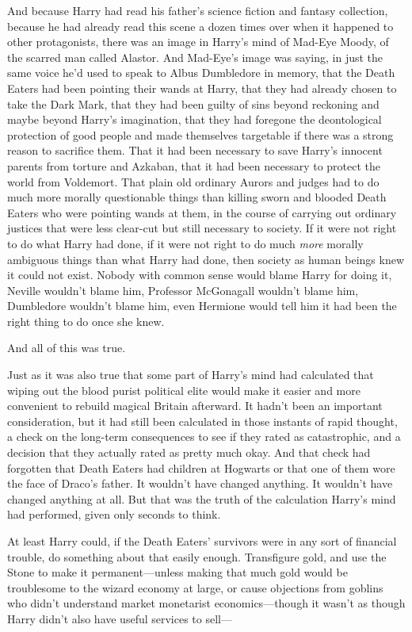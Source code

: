 And because Harry had read his father's science fiction and fantasy collection,
because he had already read this scene a dozen times over when it happened to
other protagonists, there was an image in Harry's mind of Mad-Eye Moody, of the
scarred man called Alastor. And Mad-Eye's image was saying, in just the same
voice he'd used to speak to Albus Dumbledore in memory, that the Death Eaters
had been pointing their wands at Harry, that they had already chosen to take
the Dark Mark, that they had been guilty of sins beyond reckoning and maybe
beyond Harry's imagination, that they had foregone the deontological protection
of good people and made themselves targetable if there was a strong reason to
sacrifice them. That it had been necessary to save Harry's innocent parents
from torture and Azkaban, that it had been necessary to protect the world from
Voldemort. That plain old ordinary Aurors and judges had to do much more
morally questionable things than killing sworn and blooded Death Eaters who
were pointing wands at them, in the course of carrying out ordinary justices
that were less clear-cut but still necessary to society. If it were not right
to do what Harry had done, if it were not right to do much \emph{more} morally
ambiguous things than what Harry had done, then society as human beings knew it
could not exist. Nobody with common sense would blame Harry for doing it,
Neville wouldn't blame him, Professor McGonagall wouldn't blame him, Dumbledore
wouldn't blame him, even Hermione would tell him it had been the right thing to
do once she knew.

And all of this was true.

Just as it was also true that some part of Harry's mind had calculated that
wiping out the blood purist political elite would make it easier and more
convenient to rebuild magical Britain afterward. It hadn't been an important
consideration, but it had still been calculated in those instants of rapid
thought, a check on the long-term consequences to see if they rated as
catastrophic, and a decision that they actually rated as pretty much okay. And
that check had forgotten that Death Eaters had children at Hogwarts or that one
of them wore the face of Draco's father. It wouldn't have changed anything. It
wouldn't have changed anything at all. But that was the truth of the
calculation Harry's mind had performed, given only seconds to think.

At least Harry could, if the Death Eaters' survivors were in any sort of
financial trouble, do something about that easily enough. Transfigure gold, and
use the Stone to make it permanent---unless making that much gold would be
troublesome to the wizard economy at large, or cause objections from goblins
who didn't understand market monetarist economics---though it wasn't as though
Harry didn't also have useful services to sell---

